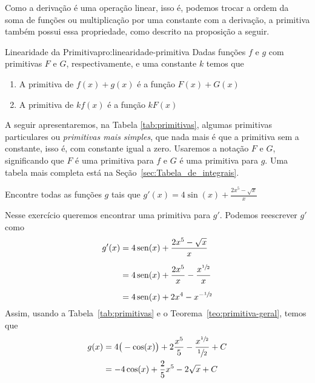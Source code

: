 Como a derivação é uma operação linear, isso é, podemos trocar a ordem
da soma de funções ou multiplicação por uma constante com a derivação,
a primitiva também possui essa propriedade, como descrito na
proposição a seguir.

\begin{proposicao}{Linearidade da Primitiva}{pro:linearidade-primitiva}
  Dadas funções $f$ e $g$ com primitivas $F$ e $G$, respectivamente,
  e uma constante $k$ temos que
  \begin{enumerate}[parsep=11pt]
    \item A primitiva de \( f(x)+g(x)\) é a função \(F(x) + G(x)\)
    \item A primitiva de \( kf(x)\) é a função \(kF(x)\)
  \end{enumerate}
\end{proposicao}

A seguir apresentaremos, na Tabela \ref{tab:primitivas}, algumas primitivas
particulares ou \textit{primitivas mais simples}, que nada mais é que a
primitiva sem a constante, isso é, com constante igual a zero.
Usaremos a notação $F$ e $G$,
significando que $F$ é uma primitiva para $f$ e $G$ é uma primitiva para $g$.
Uma tabela mais completa está na Seção~\ref{sec:Tabela_de_integrais}.

\begin{example}
  Encontre todas as funções $g$ tais que
  \(
    g'(x)= 4 \sin(x)+ \frac{2x^5- \sqrt{x}}{x}
  \)

  \solution
  Nesse exercício queremos encontrar uma primitiva para $g'$.
  Podemos reescrever $g'$ como
  \begin{align*}
    g'(x)
    & = 4 \operatorname{sen}(x) + \frac{2x^5- \sqrt{x}}{x} \\[2mm]
    & = 4 \operatorname{sen}(x) + \frac{2x^5}{x} - \frac{x^{\sfrac{1}{2}}}{x} \\[2mm]
    & = 4 \operatorname{sen}(x) + 2x^4 -x^{-\sfrac{1}{2}}
  \end{align*}
  Assim, usando a Tabela~\ref{tab:primitivas} e o
  Teorema~\ref{teo:primitiva-geral}, temos que
  \begin{align*}
    g(x)
    & = 4\big(-\cos(x)\big)
      + 2 \frac{x^5}{5}
      - \frac{x^{\sfrac{1}{2}}}{\sfrac{1}{2}}
      + C \\
    & = -4 \cos(x) + \frac{2}{5}x^5 - 2 \sqrt{x} + C
  \end{align*}
\end{example}


